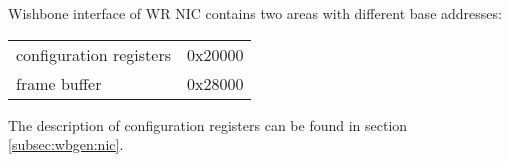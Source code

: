 \vspace{12pt}

Wishbone interface of WR NIC contains two areas with different base addresses:\\

\begin{tabular}{l l}
  configuration registers & 0x20000\\
            frame buffer  & 0x28000\\
\end{tabular}

\vspace{12pt}
The description of configuration registers can be found in section
\ref{subsec:wbgen:nic}.
